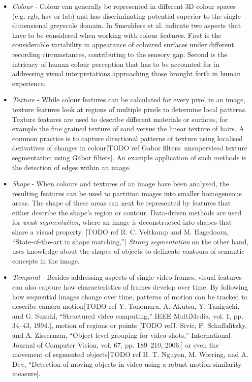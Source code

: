\begin{itemize}
  \item \emph{Colour} - Colour can generally be represented in different 3D colour spaces (e.g. rgb, hsv or l\*a\*b) and has discriminating potential superior to the single dimensional greyscale domain. In \cite{Smeulders:2000tx} Smeulders et al. indicate two aspects that have to be considered when working with colour features. First is the considerable variability in appearance of coloured surfaces under different recording circumstances, contributing to the sensory gap. Second is the intricacy of human colour perception that has to be accounted for in addressing visual interpretations approaching those brought forth in human experience.
  \item \emph{Texture} - While colour features can be calculated for every pixel in an image, texture features look at regions of multiple pixels to determine local patterns. Texture features are used to describe different materials or surfaces, for example the fine grained texture of sand versus the linear texture of hairs. A common practice is to capture directional patterns of texture using localised derivatives of changes in colour[TODO ref Gabor filters:  unsupervised texture segmentation using Gabor filters]. An example application of such methods is the detection of edges within an image.

  \item \emph{Shape} - When colours and textures of an image have been analysed, the resulting features can be used to partition images into smaller homogeneous areas. The shape of these areas can next be represented by features that either describe the shape's region or contour. Data-driven methods are used for \emph{weak segmentation}, where an image is deconstructed into shapes that share a visual property. [TODO ref R. C. Veltkamp and M. Hagedoorn, “State-of-the-art in shape matching,”] \emph{Strong segmentation} on the other hand, uses knowledge about the shapes of objects to delineate contours of semantic concepts in the image.

  \item \emph{Temporal} - Besides addressing aspects of single video frames, visual features can also capture how characteristics of frames develop over time. By following how sequential images change over time, patterns of motion can be tracked to describe camera motion[TODO ref Y. Tonomura, A. Akutsu, Y. Taniguchi, and G. Suzuki, “Structured video computing,” IEEE MultiMedia, vol. 1, pp. 34–43, 1994.], motion of regions or points [TODO refJ. Sivic, F. Schaffalitzky, and A. Zisserman, “Object level grouping for video shots,” International Journal of Computer Vision, vol. 67, pp. 189–210, 2006.] or even the movement of segmented objects[TODO ref H. T. Nguyen, M. Worring, and A. Dev, “Detection of moving objects in video using a robust motion similarity measure].

\end{itemize}

